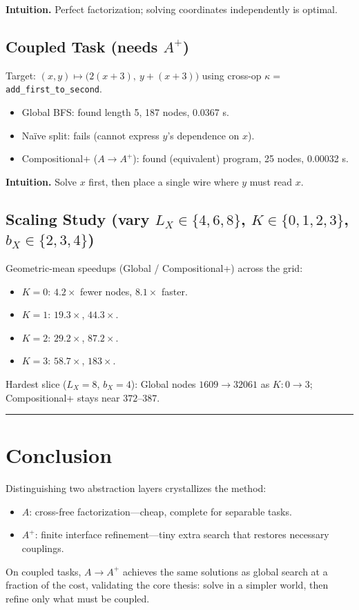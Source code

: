 \documentclass[11pt]{article}
\begin{document}
\textbf{Intuition.} Perfect factorization; solving coordinates independently is optimal.

\subsection{Coupled Task (needs $A^{+}$)}

Target: $(x,y)\mapsto\big(2(x+3),\ y+(x+3)\big)$ using cross-op $\kappa=$ \texttt{add\_first\_to\_second}.
\begin{itemize}
    \item Global BFS: found length 5, 187 nodes, 0.0367 s.
    \item Naïve split: fails (cannot express $y$'s dependence on $x$).
    \item Compositional+ ($A\to A^{+}$): found (equivalent) program, 25 nodes, 0.00032 s.
\end{itemize}

\textbf{Intuition.} Solve $x$ first, then place a single wire where $y$ must read $x$.

\subsection{Scaling Study (vary $L_X\in\{4,6,8\}$, $K\in\{0,1,2,3\}$, $b_X\in\{2,3,4\}$)}

Geometric-mean speedups (Global / Compositional+) across the grid:
\begin{itemize}
    \item $K=0$: $4.2\times$ fewer nodes, $8.1\times$ faster.
    \item $K=1$: $19.3\times$, $44.3\times$.
    \item $K=2$: $29.2\times$, $87.2\times$.
    \item $K=3$: $58.7\times$, $183\times$.
\end{itemize}

Hardest slice ($L_X=8$, $b_X=4$):
Global nodes $1609 \to 32061$ as $K:0\to3$; Compositional+ stays near $372$--$387$.

\vspace{6pt}\noindent\rule{\textwidth}{0.4pt}\vspace{6pt}

\section{Conclusion}

Distinguishing two abstraction layers crystallizes the method:
\begin{itemize}
    \item $A$: cross-free factorization---cheap, complete for separable tasks.
    \item $A^{+}$: finite interface refinement---tiny extra search that restores necessary couplings.
\end{itemize}

On coupled tasks, $A\to A^{+}$ achieves the same solutions as global search at a fraction of the cost, validating the core thesis: solve in a simpler world, then refine only what must be coupled.
\end{document}
